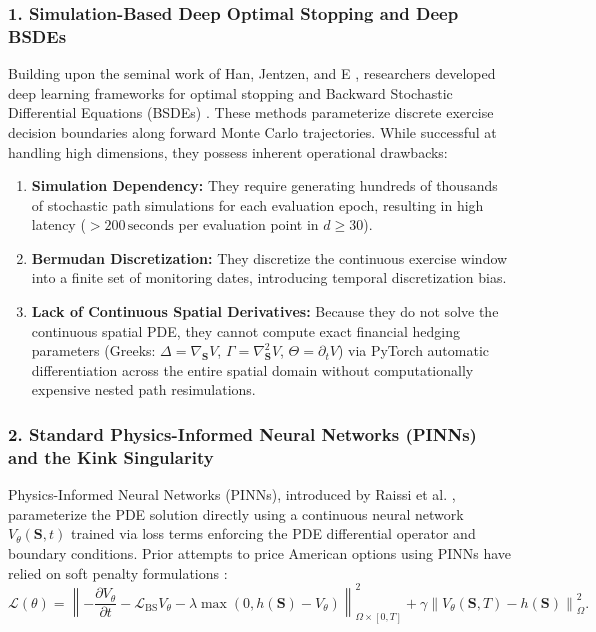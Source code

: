 \documentclass[11pt,a4paper]{article}
\begin{document}
\subsubsection{1. Simulation-Based Deep Optimal Stopping and Deep BSDEs}
Building upon the seminal work of Han, Jentzen, and E \cite{han2018solving}, researchers developed deep learning frameworks for optimal stopping and Backward Stochastic Differential Equations (BSDEs) \cite{becker2019deep, becker2020solving, lapeyre2020neural}. These methods parameterize discrete exercise decision boundaries along forward Monte Carlo trajectories. While successful at handling high dimensions, they possess inherent operational drawbacks:
\begin{enumerate}[label=(\alph*)]
    \item \textbf{Simulation Dependency:} They require generating hundreds of thousands of stochastic path simulations for each evaluation epoch, resulting in high latency ($> 200\,\text{seconds}$ per evaluation point in $d \ge 30$).
    \item \textbf{Bermudan Discretization:} They discretize the continuous exercise window into a finite set of monitoring dates, introducing temporal discretization bias.
    \item \textbf{Lack of Continuous Spatial Derivatives:} Because they do not solve the continuous spatial PDE, they cannot compute exact financial hedging parameters (Greeks: $\Delta = \nabla_{\mathbf{S}} V$, $\Gamma = \nabla^2_{\mathbf{S}} V$, $\Theta = \partial_t V$) via PyTorch automatic differentiation across the entire spatial domain without computationally expensive nested path resimulations.
\end{enumerate}

\subsubsection{2. Standard Physics-Informed Neural Networks (PINNs) and the Kink Singularity}
Physics-Informed Neural Networks (PINNs), introduced by Raissi et al. \cite{raissi2019physics}, parameterize the PDE solution directly using a continuous neural network $V_\theta(\mathbf{S}, t)$ trained via loss terms enforcing the PDE differential operator and boundary conditions. Prior attempts to price American options using PINNs have relied on soft penalty formulations \cite{al2018solving, larios2021neural, he2022dual}:
\begin{equation}
\label{eq:penalty_pinn_loss}
\mathcal{L}(\theta) = \left\| -\frac{\partial V_\theta}{\partial t} - \mathcal{L}_{\text{BS}} V_\theta - \lambda \max\left(0, h(\mathbf{S}) - V_\theta\right) \right\|_{\Omega \times [0, T]}^2 + \gamma \left\| V_\theta(\mathbf{S}, T) - h(\mathbf{S}) \right\|_\Omega^2.
\end{equation}
\end{document}
